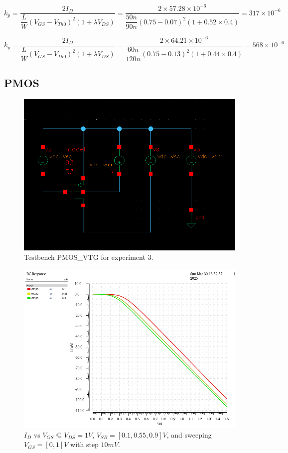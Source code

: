 \[ k_p = \dfrac{2I_{D}}{\dfrac{L}{W} (V_{GS} - V_{Th0})^{2} (1 + \lambda V_{DS})} = \dfrac{2\times 57.28\times 10^{-6}}{\dfrac{50n}{90n} (0.75 - 0.07)^{2} (1 + 0.52 \times 0.4)} = 317 \times 10^{-6}\]


\[ k_p = \dfrac{2I_{D}}{\dfrac{L}{W} (V_{GS} - V_{Th0})^{2} (1 + \lambda V_{DS})} = \dfrac{2\times 64.21 \times 10^{-6}}{\dfrac{60n}{120n} (0.75 - 0.13)^{2} (1 + 0.44 \times 0.4)} = 568 \times 10^{-6}\]


\subsection{PMOS}

\begin{figure}[H]
	\centering
	\includegraphics[width = 0.6\linewidth]{sections/pic/EX3_PMOS_schematic.png}
	\caption{Testbench PMOS\_VTG for experiment 3.}
	\label{f_ex3PMOS-schematic}
\end{figure}


\begin{figure}[H]
	\centering
	\includegraphics[width=.6\linewidth]{sections/pic/EX3_PMOS_Id&Vgs(Vds=0_1)(w)(l).png}
	\caption{$I_{D}$ vs $V_{GS}$ @ $V_{DS} = 1V$, $V_{SB} = [0.1, 0.55, 0.9] V$, and sweeping $V_{GS} = [0, 1]V$ with step $10mV$.}
	\label{f_EX3_PMOS_Id&Vgs(Vds=0_1)(w)(l)}
\end{figure}

